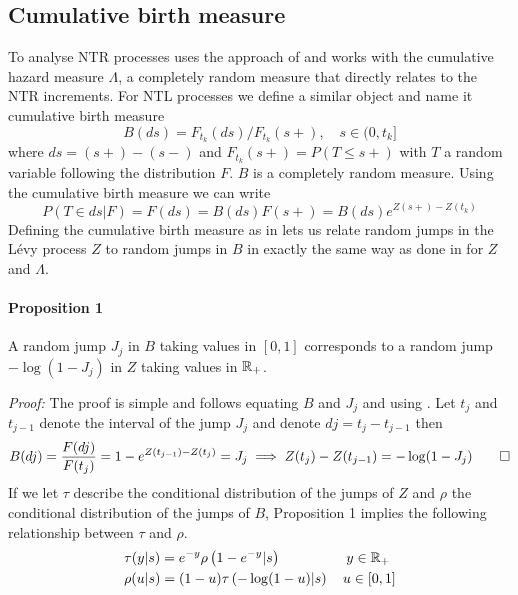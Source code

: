 \subsection{Cumulative birth measure}\label{CBM}
To analyse NTR processes \cite{james2006poisson} uses the approach of \cite{hjort1990nonparametric} and works with the cumulative hazard measure $\Lambda$, a completely random measure that directly relates to the NTR increments. For NTL processes we define a similar object and name it cumulative birth measure 
\begin{equation}\label{birth_measure}
B(ds) = F_{t_k}(ds)/F_{t_k}(s+), \quad s \in (0, t_k]
\end{equation}
where $ds = (s+) - (s-)$ and $F_{t_k}(s+) = P(T \leq s+)$ with $T$ a random variable following the distribution $F$. $B$ is a completely random measure. Using the cumulative birth measure we can write
\begin{equation*}
P(T \in ds | F) = F(ds) = B(ds)F(s+) = B(ds)e^{Z(s+) - Z(t_k)}
\end{equation*}
Defining the cumulative birth measure as in  lets us relate random jumps in the L{\'e}vy process $Z$ to random jumps in $B$ in exactly the same way as done in \cite{james2006poisson} for $Z$ and $\Lambda$. 

\paragraph{Proposition 1} A random jump $J_j$ in $B$ taking values in $[0,1]$ corresponds to a random jump $-\log(1 - J_j)$ in $Z$ taking values in $\mathbb{R}_+$.

\textit{Proof:} The proof is simple and follows equating $B$ and $J_j$ and using . Let $t_j$ and $t_{j-1}$ denote the interval of the jump $J_j$ and denote $dj = t_j - t_{j-1}$ then
\begin{equation*}
\begin{split}
B(dj) = \frac{F(dj)}{F(t_j)} = 1 - e^{Z(t_{j-1}) -Z(t_j)} = J_j \implies Z(t_j) - Z(t_{j-1}) = -\log(1- J_j) \qed
\end{split}
\end{equation*}
If we let $\tau$ describe the conditional distribution of the jumps of $Z$ and $\rho$ the conditional distribution of the jumps of $B$, Proposition 1 implies the following relationship between $\tau$ and $\rho$.
\begin{equation*}
\begin{split}
&\tau(y|s) = e^{-y}\rho\left(1- e^{-y} | s\right) \ \ \qquad\qquad y \in \mathbb{R}_{+} \\ & \rho(u|s) = (1- u)\tau\left(-\log(1-u) |s\right) \quad u \in [0, 1]
\end{split}
\end{equation*}



